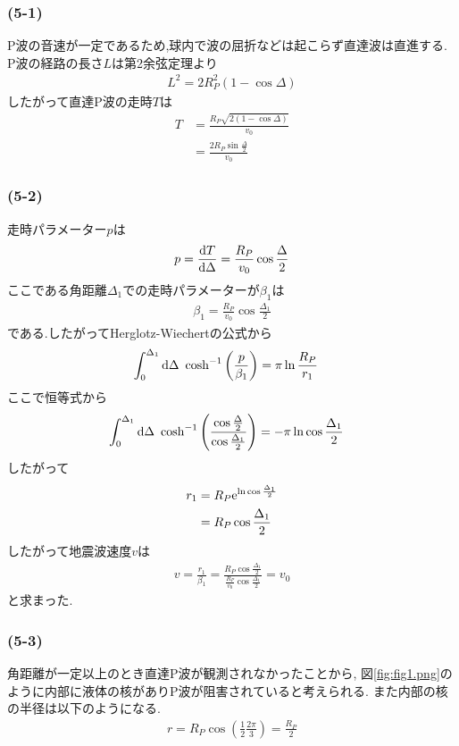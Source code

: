 \subsubsection*{(5-1)}
P波の音速が一定であるため,球内で波の屈折などは起こらず直達波は直進する.
P波の経路の長さ$L$は第2余弦定理より
\begin{align}
  L^2=2R_P^2(1-\cos\Delta)
\end{align}
したがって直達P波の走時$T$は
\begin{align}
  T&=\frac{R_P\sqrt{2(1-\cos\Delta)}}{v_0}\\
  &=\frac{2R_P\sin\frac{\Delta}{2}}{v_0}
\end{align}
\subsubsection*{(5-2)}
走時パラメーター$p$は
\begin{align}
  p=\frac{{\rm d}T}{{\rm d}\Delta}=\frac{R_P}{v_0}\cos\frac{\Delta}{2}
\end{align}
ここである角距離$\Delta_1$での走時パラメーターが$\beta_1$は
\begin{align}
  \beta_1=\frac{R_P}{v_0}\cos\frac{\Delta_1}{2}
\end{align}
である.したがってHerglotz-Wiechertの公式から
\begin{align}
  \int_0^{\Delta_1}{\rm d}\Delta\ \cosh^{-1}\left(\frac{p}{\beta_1}\right)&=\pi\ln\frac{R_P}{r_1}
\end{align}
ここで恒等式から
\begin{align}
  \int_0^{\Delta_1}{\rm d}\Delta\ \cosh^{-1}\left(\frac{\cos\frac{\Delta}{2}}{\cos\frac{\Delta_1}{2}}\right)&=-\pi\ln\cos\frac{\Delta_1}{2}
\end{align}
したがって
\begin{align}
  r_1&=R_P{\rm e}^{\ln\cos\frac{\Delta_1}{2}}\\
  &=R_P\cos\frac{\Delta_1}{2}
\end{align}
したがって地震波速度$v$は
\begin{align}
  v=\frac{r_1}{\beta_1}=\frac{R_P\cos\frac{\Delta_1}{2}}{\frac{R_P}{v_0}\cos\frac{\Delta_1}{2}}=v_0
\end{align}
と求まった.
\subsubsection*{(5-3)}
角距離が一定以上のとき直達P波が観測されなかったことから,
図\ref{fig:fig1.png}のように内部に液体の核がありP波が阻害されていると考えられる.
また内部の核の半径は以下のようになる.
\begin{align}
  r=R_P\cos\left(\frac{1}{2}\frac{2\pi}{3}\right)=\frac{R_P}{2}
\end{align}
